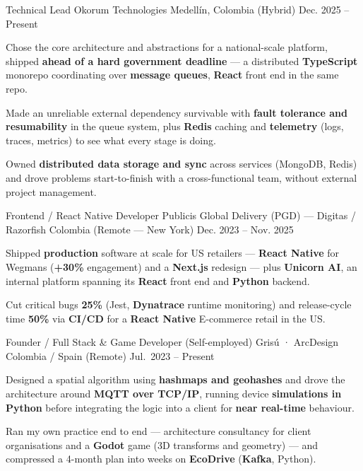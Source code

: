 \newcommand{\quotes}[1]{``#1''}

\begin{cventries}

  \cventry
  {Technical Lead}
  {Okorum Technologies}
  {Medellín, Colombia (Hybrid)}
  {Dec. 2025 -- Present}
  {
    \begin{cvitems}
      \item {Chose the core architecture and abstractions for a national-scale platform, shipped \textbf{ahead of a hard government deadline} --- a distributed \textbf{TypeScript} monorepo coordinating over \textbf{message queues}, \textbf{React} front end in the same repo.}
      \item {Made an unreliable external dependency survivable with \textbf{fault tolerance and resumability} in the queue system, plus \textbf{Redis} caching and \textbf{telemetry} (logs, traces, metrics) to see what every stage is doing.}
      \item {Owned \textbf{distributed data storage and sync} across services (MongoDB, Redis) and drove problems start-to-finish with a cross-functional team, without external project management.}
    \end{cvitems}
  }

  \cventry
  {Frontend / React Native Developer}
  {Publicis Global Delivery (PGD) — Digitas / Razorfish}
  {Colombia (Remote — New York)}
  {Dec. 2023 -- Nov. 2025}
  {
    \begin{cvitems}
      \item {Shipped \textbf{production} software at scale for US retailers --- \textbf{React Native} for Wegmans (\textbf{+30\%} engagement) and a \textbf{Next.js} redesign --- plus \textbf{Unicorn AI}, an internal platform spanning its \textbf{React} front end and \textbf{Python} backend.}
      \item {Cut critical bugs \textbf{25\%} (Jest, \textbf{Dynatrace} runtime monitoring) and release-cycle time \textbf{50\%} via \textbf{CI/CD} for a \textbf{React Native} E-commerce retail in the US.}
    \end{cvitems}
  }

  \cventry
  {Founder / Full Stack \& Game Developer (Self-employed)}
  {Grisú · ArcDesign}
  {Colombia / Spain (Remote)}
  {Jul.\ 2023 -- Present}
  {
    \begin{cvitems}
      \item {Designed a spatial algorithm using \textbf{hashmaps and geohashes} and drove the architecture around \textbf{MQTT over TCP/IP}, running device \textbf{simulations in Python} before integrating the logic into a client for \textbf{near real-time} behaviour.}
      \item {Ran my own practice end to end --- architecture consultancy for client organisations and a \textbf{Godot} game (3D transforms and geometry) --- and compressed a 4-month plan into weeks on \textbf{EcoDrive} (\textbf{Kafka}, Python).}
    \end{cvitems}
  }


\end{cventries}
